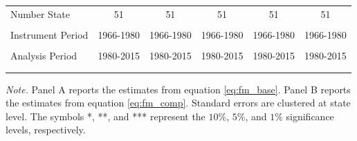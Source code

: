 \documentclass[dv_diss_main.tex]{subfiles}
\begin{document}
\begin{table}[H]
\begin{center}
{\begin{tabular}{lccccc}
    Number State & 51 & 51 & 51 & 51 & 51 \\
    \vspace{-2pt} & \vspace{-2pt} & \vspace{-2pt} & \vspace{-2pt} & \vspace{-2pt} \\
    Instrument Period & 1966-1980 & 1966-1980 & 1966-1980 & 1966-1980 & 1966-1980 \\
    \vspace{-2pt} & \vspace{-2pt} & \vspace{-2pt} & \vspace{-2pt} & \vspace{-2pt} \\
    Analysis Period & 1980-2015 & 1980-2015 & 1980-2015 & 1980-2015 & 1980-2015 \\ 
    \vspace{-2pt} & \vspace{-2pt} & \vspace{-2pt} & \vspace{-2pt} & \vspace{-2pt} \\ \hline

    \vspace{-2pt} & \vspace{-2pt} & \vspace{-2pt} & \vspace{-2pt} \\
    
    
    \end{tabular}
    }
    \label{tab:fm_state}
    \end{center}
        
    \footnotesize{\textit{Note. }Panel A reports the estimates from equation \eqref{eq:fm_base}. Panel B reports the estimates from equation \eqref{eq:fm_comp}. Standard errors are clustered at state level. The symbols *, **, and *** represent the $10\%$, $5\%$, and $1\%$ significance levels, respectively.}
\end{table}
\end{document}
